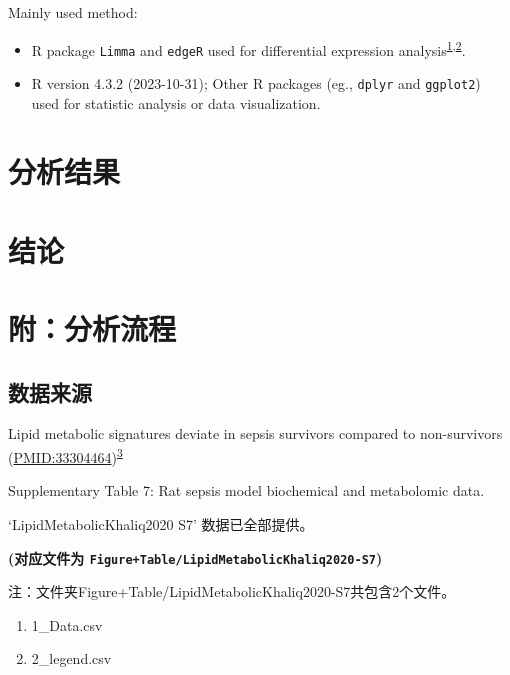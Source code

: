 \documentclass[
]{article}
\providecommand{\tightlist}{%
  \setlength{\itemsep}{0pt}\setlength{\parskip}{0pt}}
\begin{document}
Mainly used method:

\begin{itemize}
\tightlist
\item
  R package \texttt{Limma} and \texttt{edgeR} used for differential expression analysis\textsuperscript{\protect\hyperlink{ref-LimmaPowersDiRitchi2015}{1},\protect\hyperlink{ref-EdgerDifferenChen}{2}}.
\item
  R version 4.3.2 (2023-10-31); Other R packages (eg., \texttt{dplyr} and \texttt{ggplot2}) used for statistic analysis or data visualization.
\end{itemize}

\hypertarget{results}{%
\section{分析结果}\label{results}}

\hypertarget{dis}{%
\section{结论}\label{dis}}

\hypertarget{workflow}{%
\section{附：分析流程}\label{workflow}}

\hypertarget{ux6570ux636eux6765ux6e90}{%
\subsection{数据来源}\label{ux6570ux636eux6765ux6e90}}

Lipid metabolic signatures deviate in sepsis survivors compared to non-survivors
(\url{PMID:33304464})\textsuperscript{\protect\hyperlink{ref-LipidMetabolicKhaliq2020}{3}}

Supplementary Table 7: Rat sepsis model biochemical and metabolomic data.

`LipidMetabolicKhaliq2020 S7' 数据已全部提供。

\textbf{(对应文件为 \texttt{Figure+Table/LipidMetabolicKhaliq2020-S7})}

\begin{center}\begin{tcolorbox}[colback=gray!10, colframe=gray!50, width=0.9\linewidth, arc=1mm, boxrule=0.5pt]注：文件夹Figure+Table/LipidMetabolicKhaliq2020-S7共包含2个文件。

\begin{enumerate}\tightlist
\item 1\_Data.csv
\item 2\_legend.csv
\end{enumerate}\end{tcolorbox}
\end{center}
\end{document}

